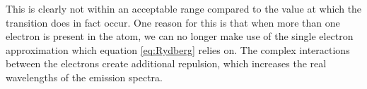 This is clearly not within an acceptable range compared to the value at which the transition does in fact occur.
One reason for this is that when more than one electron is present in the atom, we can no longer make use of the
single electron approximation which equation \ref*{eq:Rydberg} relies on. The complex interactions between the electrons
create additional repulsion, which increases the real wavelengths of the emission spectra.
\begin{table}

    \begin{adjustwidth}{-1cm}{-1cm}
\end{adjustwidth}
\end{table}
